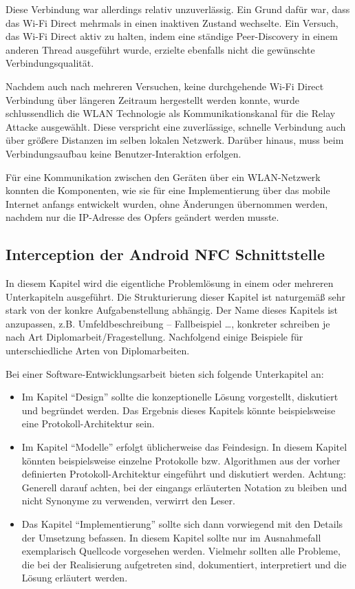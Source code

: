 Diese Verbindung war allerdings relativ unzuverlässig. Ein Grund dafür war, dass das Wi-Fi Direct mehrmals in einen inaktiven Zustand wechselte. Ein Versuch, das Wi-Fi Direct aktiv zu halten, indem eine ständige Peer-Discovery in einem anderen Thread ausgeführt wurde, erzielte ebenfalls nicht die gewünschte Verbindungsqualität. 

Nachdem auch nach mehreren Versuchen, keine durchgehende Wi-Fi Direct Verbindung über längeren Zeitraum hergestellt werden konnte, wurde schlussendlich die WLAN Technologie als Kommunikationskanal für die Relay Attacke ausgewählt. Diese verspricht eine zuverlässige, schnelle Verbindung auch über größere Distanzen im selben lokalen Netzwerk. Darüber hinaus, muss beim Verbindungsaufbau keine Benutzer-Interaktion erfolgen. 

Für eine Kommunikation zwischen den Geräten über ein WLAN-Netzwerk konnten die Komponenten, wie sie für eine Implementierung über das mobile Internet anfangs entwickelt wurden, ohne Änderungen übernommen werden, nachdem nur die IP-Adresse des Opfers geändert werden musste. 

\subsection{Interception der Android NFC Schnittstelle}




In diesem Kapitel wird die eigentliche Problemlösung in einem oder mehreren Unterkapiteln ausgeführt. Die Strukturierung dieser Kapitel ist naturgemäß sehr stark von der konkre Aufgabenstellung abhängig. Der Name dieses Kapitels ist anzupassen, z.B. Umfeldbeschreibung -- Fallbeispiel \dots, konkreter schreiben je nach Art Diplomarbeit/Fragestellung.
\makeatletter\ifthesis@masterthesis
Nachfolgend einige Beispiele für unterschiedliche Arten von Diplomarbeiten.

Bei einer Software-Entwicklungsarbeit bieten sich folgende Unterkapitel an:
\begin{itemize}
	\item Im Kapitel \enquote{Design} sollte die konzeptionelle Lösung vorgestellt, diskutiert und begründet werden. Das Ergebnis dieses Kapitels könnte beispielsweise eine Protokoll-Architektur sein.
	\item Im Kapitel \enquote{Modelle} erfolgt üblicherweise das Feindesign. In diesem Kapitel könnten beispielsweise einzelne Protokolle bzw. Algorithmen aus der vorher definierten Protokoll-Architektur eingeführt und diskutiert werden. Achtung: Generell darauf achten, bei der eingangs erläuterten Notation zu bleiben und nicht Synonyme zu verwenden, verwirrt den Leser.
	\item Das Kapitel \enquote{Implementierung} sollte sich dann vorwiegend mit den Details der Umsetzung befassen. In diesem Kapitel sollte nur im Ausnahmefall exemplarisch Quellcode vorgesehen werden. Vielmehr sollten alle Probleme, die bei der Realisierung aufgetreten sind, dokumentiert, interpretiert und die Lösung erläutert werden.
\end{itemize}

